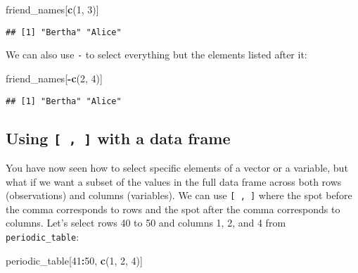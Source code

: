 \documentclass[]{tufte-book}
\newenvironment{Shaded}{\begin{snugshade}}{\end{snugshade}}
\newcommand{\DecValTok}[1]{\textcolor[rgb]{0.00,0.00,0.81}{#1}}
\newcommand{\KeywordTok}[1]{\textcolor[rgb]{0.13,0.29,0.53}{\textbf{#1}}}
\newcommand{\NormalTok}[1]{#1}
\newcommand{\OperatorTok}[1]{\textcolor[rgb]{0.81,0.36,0.00}{\textbf{#1}}}
\begin{document}
\begin{Shaded}
\begin{Highlighting}[]
\NormalTok{friend_names[}\KeywordTok{c}\NormalTok{(}\DecValTok{1}\NormalTok{, }\DecValTok{3}\NormalTok{)]}
\end{Highlighting}
\end{Shaded}

\begin{verbatim}
## [1] "Bertha" "Alice"
\end{verbatim}

We can also use \texttt{-} to select everything but the elements listed after it:

\begin{Shaded}
\begin{Highlighting}[]
\NormalTok{friend_names[}\OperatorTok{-}\KeywordTok{c}\NormalTok{(}\DecValTok{2}\NormalTok{, }\DecValTok{4}\NormalTok{)]}
\end{Highlighting}
\end{Shaded}

\begin{verbatim}
## [1] "Bertha" "Alice"
\end{verbatim}

\hypertarget{using-with-a-data-frame}{%
\subsection{\texorpdfstring{Using \texttt{{[}\ ,\ {]}} with a data frame}{Using {[} , {]} with a data frame}}\label{using-with-a-data-frame}}

You have now seen how to select specific elements of a vector or a variable, but what if we want a subset of the values in the full data frame across both rows (observations) and columns (variables). We can use \texttt{{[}\ ,\ {]}} where the spot before the comma corresponds to rows and the spot after the comma corresponds to columns. Let's select rows 40 to 50 and columns 1, 2, and 4 from \texttt{periodic\_table}:

\begin{Shaded}
\begin{Highlighting}[]
\NormalTok{periodic_table[}\DecValTok{41}\OperatorTok{:}\DecValTok{50}\NormalTok{, }\KeywordTok{c}\NormalTok{(}\DecValTok{1}\NormalTok{, }\DecValTok{2}\NormalTok{, }\DecValTok{4}\NormalTok{)]}
\end{Highlighting}
\end{Shaded}
\end{document}
